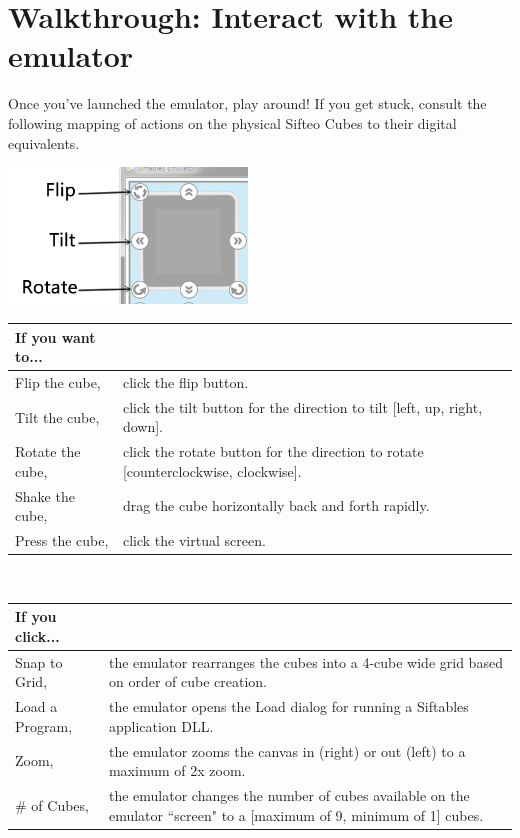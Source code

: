 \documentclass[12pt]{article}
\begin{document}
\section{Walkthrough: Interact with the emulator}
Once you've launched the emulator, play around! If you get stuck, consult the following mapping of actions on the physical Sifteo Cubes to their digital equivalents.

\begin{center}\includegraphics[width=2.5in]{interact}\end{center}
\begin{center}
    \begin{tabular}{ | p{1.5in} | p{4.5in} | }
    \hline
    \textbf{If you want to...}   \\\hline
    Flip the cube,  & click the flip button. \\\hline
    Tilt the cube, & click the tilt button for the direction to tilt [left, up, right, down]. \\\hline
    Rotate the cube, & click the rotate button for the direction to rotate [counterclockwise, clockwise]. \\\hline
    Shake the cube, & drag the cube horizontally back and forth rapidly. \\\hline
    Press the cube, & click the virtual screen. \\\hline
    \end{tabular}\\

    \begin{tabular}{ | p{1.5in} | p{4.5in} | }
    \hline
    \textbf{If you click...}   \\\hline
    Snap to Grid, & the emulator rearranges the cubes into a 4-cube wide grid based on order of cube creation. \\\hline
    Load a Program, & the emulator opens the Load dialog for running a Siftables application DLL. \\\hline
    Zoom,  & the emulator zooms the canvas in (right) or out (left) to a maximum of 2x zoom. \\\hline
    \# of Cubes, & the emulator changes the number of cubes available on the emulator ``screen" to a [maximum of 9, minimum of 1] cubes. \\\hline
    \end{tabular}

\end{center}
\end{document}
